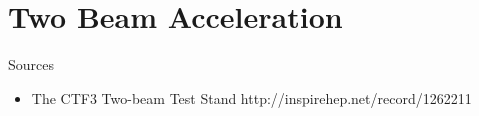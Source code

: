 \section{Two Beam Acceleration}

Sources
\begin{itemize}
\item
The CTF3 Two-beam Test Stand
http://inspirehep.net/record/1262211
\end{itemize}

